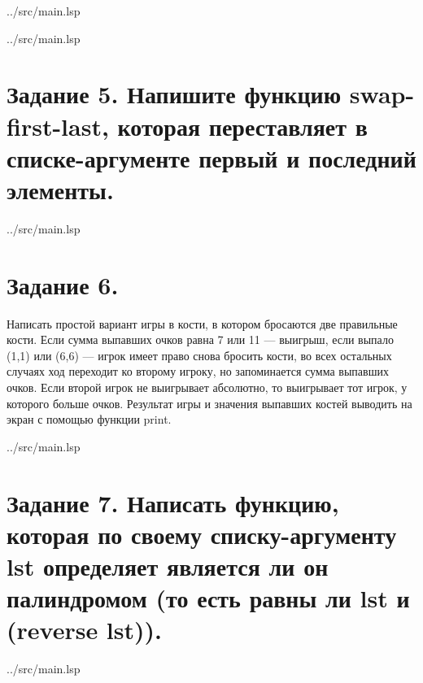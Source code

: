 \clearpage

\begin{lstinputlisting}[
	caption={Задание 4, вариант 1},
	label={lst:t4-1},
	style={lsp},
	linerange={41-53},
	]{../src/main.lsp}
\end{lstinputlisting}

\begin{lstinputlisting}[
	caption={Задание 4, вариант 2},
	label={lst:t4-2},
	style={lsp},
	linerange={55-57},
	]{../src/main.lsp}
\end{lstinputlisting}

\section*{Задание 5. Напишите   функцию   swap-first-last,   которая   переставляет   в   списке-аргументе первый и последний элементы.}

\begin{lstinputlisting}[
	caption={Задание 5},
	label={lst:t5},
	style={lsp},
	linerange={59-66},
	]{../src/main.lsp}
\end{lstinputlisting}

\section*{Задание 6. }
Написать простой вариант игры в кости, в котором бросаются две правильные кости. Если сумма выпавших очков равна 7 или 11   — выигрыш, если выпало (1,1) или (6,6)   — игрок имеет право снова бросить кости, во всех остальных случаях ход переходит ко второму игроку, но запоминается сумма выпавших очков. Если второй игрок не выигрывает абсолютно, то выигрывает тот игрок, у которого больше очков. Результат игры и значения выпавших костей выводить на экран с помощью функции print.

\begin{lstinputlisting}[
	caption={Задание 6},
	label={lst:t6},
	style={lsp},
	linerange={67-127},
	]{../src/main.lsp}
\end{lstinputlisting}

\section*{Задание 7. Написать функцию, которая по своему списку-аргументу lst определяет является ли он палиндромом (то есть равны ли lst и (reverse lst)).}

\begin{lstinputlisting}[
	caption={Задание 7},
	label={lst:t7},
	style={lsp},
	linerange={145-147},
	]{../src/main.lsp}
\end{lstinputlisting}

